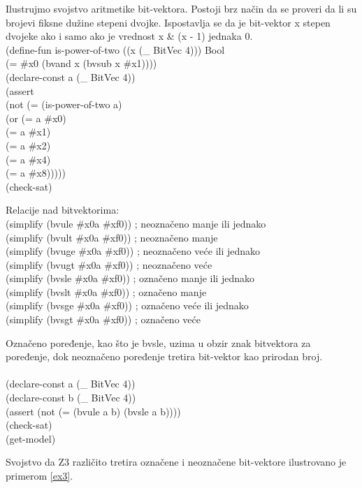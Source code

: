 \documentclass[12pt,oneside]{memoir}
\begin{document}
Ilustrujmo svojstvo aritmetike bit-vektora. Postoji brz način da se proveri da li su brojevi fiksne dužine stepeni dvojke. 
Ispostavlja se da je bit-vektor x stepen dvojeke ako i samo ako je vrednost
x \& (x - 1) jednaka 0.
\\(define-fun is-power-of-two ((x (\_ BitVec 4))) Bool 
\\  (= \#x0 (bvand x (bvsub x \#x1))))
\\(declare-const a (\_ BitVec 4))
\\(assert 
\\ (not (= (is-power-of-two a) 
\\         (or (= a \#x0) 
\\             (= a \#x1) 
\\             (= a \#x2) 
\\             (= a \#x4) 
\\             (= a \#x8)))))
\\(check-sat)

Relacije nad bitvektorima:
\\(simplify (bvule \#x0a \#xf0))  ; neoznačeno manje ili jednako
\\(simplify (bvult \#x0a \#xf0))  ; neoznačeno manje
\\(simplify (bvuge \#x0a \#xf0))  ; neoznačeno veće ili jednako
\\(simplify (bvugt \#x0a \#xf0))  ; neoznačeno veće
\\(simplify (bvsle \#x0a \#xf0))  ; označeno manje ili jednako
\\(simplify (bvslt \#x0a \#xf0))  ; označeno manje
\\(simplify (bvsge \#x0a \#xf0))  ; označeno veće ili jednako
\\(simplify (bvsgt \#x0a \#xf0))  ; označeno veće


Označeno poređenje, kao što je bvsle, uzima u obzir znak bitvektora za poređenje, dok neoznačeno poređenje tretira bit-vektor kao prirodan broj.
\\
\\(declare-const a (\_ BitVec 4))
\\(declare-const b (\_ BitVec 4))
\\(assert (not (= (bvule a b) (bvsle a b))))
\\(check-sat)
\\(get-model)

Svojstvo da Z3 različito tretira označene i neoznačene bit-vektore ilustrovano je  primerom \ref{ex3}.
\\ 

\end{document}
